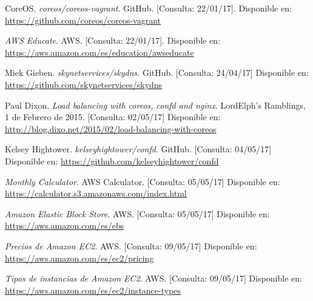 \begin{thebibliography}{9}
CoreOS.
\textit{coreos/coreos-vagrant}. GitHub. [Consulta: 22/01/17].
Disponible en: \url{https://github.com/coreos/coreos-vagrant}

\textit{AWS Educate}. AWS. [Consulta: 22/01/17].
Disponible en: \url{https://aws.amazon.com/es/education/awseducate}

Miek Gieben.
\textit{skynetservices/skydns}. GitHub. [Consulta: 24/04/17]
Disponible en: \url{https://github.com/skynetservices/skydns}

Paul Dixon.
\textit{Load balancing with coreos, confd and nginx}. 
LordElph's Ramblings, 1 de Febrero de 2015. [Consulta: 02/05/17]
Disponible en: \url{http://blog.dixo.net/2015/02/load-balancing-with-coreos}

Kelsey Hightower.
\textit{kelseyhightower/confd}. GitHub. [Consulta: 04/05/17]
Disponible en: \url{https://github.com/kelseyhightower/confd}

\textit{Monthly Calculator}. 
AWS Calculator. [Consulta: 05/05/17]
Disponible en: \url{https://calculator.s3.amazonaws.com/index.html}

\textit{Amazon Elastic Block Store}. 
AWS. [Consulta: 05/05/17]
Disponible en: \url{https://aws.amazon.com/es/ebs}

\textit{Precios de Amazon EC2}. 
AWS. [Consulta: 09/05/17]
Disponible en: \url{https://aws.amazon.com/es/ec2/pricing}

\textit{Tipos de instancias de Amazon EC2}. 
AWS. [Consulta: 09/05/17]
Disponible en: \url{https://aws.amazon.com/es/ec2/instance-types}


\end{thebibliography}


